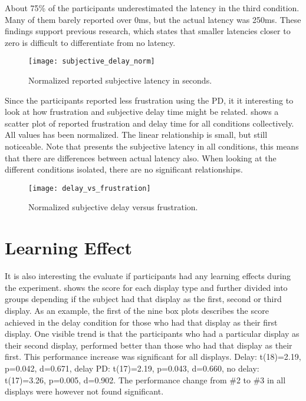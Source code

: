 About 75\% of the participants underestimated the latency in the third condition. Many of them barely reported over 0ms, but the actual latency was 250ms. These findings support previous research, which states that smaller latencies closer to zero is difficult to differentiate from no latency.

\begin{figure}[h!]
    \centering
    \texttt{[image: subjective\_delay\_norm]}
    \caption{Normalized reported subjective latency in seconds.}
    \label{subjective_delay_norm}
\end{figure}

\clearpage
Since the participants reported less frustration using the PD, it it interesting to look at how frustration and subjective delay time might be related.  shows a scatter plot of reported frustration and delay time for all conditions collectively. All values has been normalized. The linear relationship is small, but still noticeable. Note that  presents the subjective latency in all conditions, this means that there are differences between actual latency also. When looking at the different conditions isolated, there are no significant relationships.

\begin{figure}[h!]
    \centering
    \texttt{[image: delay\_vs\_frustration]}
    \caption{Normalized subjective delay versus frustration.}
    \label{delay_vs_frustration}
\end{figure}

\clearpage
\section{Learning Effect}

It is also interesting the evaluate if participants had any learning effects during the experiment.  shows the score for each display type and further divided into groups depending if the subject had that display as the first, second or third display. As an example, the first of the nine box plots describes the score achieved in the delay condition for those who had that display as their first display. One visible trend is that the participants who had a particular display as their second display, performed better than those who had that display as their first. This performance increase was significant for all displays. Delay: t(18)=2.19, p=0.042, d=0.671, delay PD: t(17)=2.19, p=0.043, d=0.660, no delay: t(17)=3.26, p=0.005, d=0.902. The performance change from \#2 to \#3 in all displays were however not found significant.

